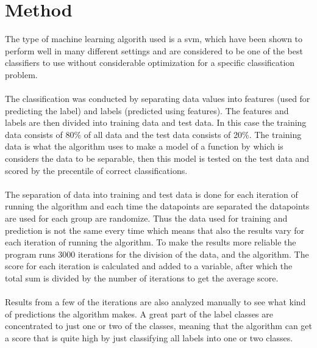 \documentclass[11pt]{article}
\begin{document}
\section{Method}
The type of machine learning algorith used is a \gls{svm}, which have been shown to perform well in many different settings and are considered to be one of the best classifiers to use without considerable optimization for a specific classification problem.\\
\\
The classification was conducted by separating data values into features (used for predicting the label) and labels (predicted using features). The features and labels are then divided into training data and test data. In this case the training data consists of 80\% of all data and the test data consists of 20\%. The training data is what the algorithm uses to make a model of a function by which is considers the data to be separable, then this model is tested on the test data and scored by the precentile of correct  classifications.\\
\\
The separation of data into training and test data is done for each iteration of running the algorithm and each time the datapoints are separated the datapoints are used for each group are randomize. Thus the data used for training and prediction is not the same every time which means that also the results vary for each iteration of running the algorithm. To make the results more reliable the program runs 3000 iterations for the division of the data, and the algorithm. The score for each iteration is calculated and added to a variable, after which the total sum is divided by the number of iterations to get the average score.\\
\\
Results from a few of the iterations are also analyzed manually to see what kind of predictions the algorithm makes. A great part of the label classes are concentrated to just one or two of the classes, meaning that the algorithm can get a score that is quite high by just classifying all labels into one or two classes.
\end{document}
